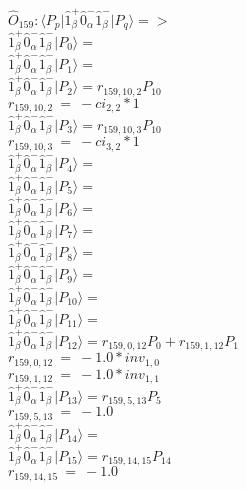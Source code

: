 \documentclass[14pt]{article}
\begin{document}
    $\hat{O}_{159}:  \langle{P_p}\vert \hat{1}_{\beta}^{+}\hat{0}_{\alpha}^{-}\hat{1}_{\beta}^{-} \vert{P_q}\rangle => $ \\ 
    $ \hat{1}_{\beta}^{+}\hat{0}_{\alpha}^{-}\hat{1}_{\beta}^{-} \vert{P_{0}}\rangle =  $ \\ 
    $ \hat{1}_{\beta}^{+}\hat{0}_{\alpha}^{-}\hat{1}_{\beta}^{-} \vert{P_{1}}\rangle =  $ \\ 
    $ \hat{1}_{\beta}^{+}\hat{0}_{\alpha}^{-}\hat{1}_{\beta}^{-} \vert{P_{2}}\rangle = {r}_{159,10,2}P_{10} $ \\ 
    ${r}_{159,10,2}\ =\ -{ci}_{2,2}*1 $ \\ 
    $ \hat{1}_{\beta}^{+}\hat{0}_{\alpha}^{-}\hat{1}_{\beta}^{-} \vert{P_{3}}\rangle = {r}_{159,10,3}P_{10} $ \\ 
    ${r}_{159,10,3}\ =\ -{ci}_{3,2}*1 $ \\ 
    $ \hat{1}_{\beta}^{+}\hat{0}_{\alpha}^{-}\hat{1}_{\beta}^{-} \vert{P_{4}}\rangle =  $ \\ 
    $ \hat{1}_{\beta}^{+}\hat{0}_{\alpha}^{-}\hat{1}_{\beta}^{-} \vert{P_{5}}\rangle =  $ \\ 
    $ \hat{1}_{\beta}^{+}\hat{0}_{\alpha}^{-}\hat{1}_{\beta}^{-} \vert{P_{6}}\rangle =  $ \\ 
    $ \hat{1}_{\beta}^{+}\hat{0}_{\alpha}^{-}\hat{1}_{\beta}^{-} \vert{P_{7}}\rangle =  $ \\ 
    $ \hat{1}_{\beta}^{+}\hat{0}_{\alpha}^{-}\hat{1}_{\beta}^{-} \vert{P_{8}}\rangle =  $ \\ 
    $ \hat{1}_{\beta}^{+}\hat{0}_{\alpha}^{-}\hat{1}_{\beta}^{-} \vert{P_{9}}\rangle =  $ \\ 
    $ \hat{1}_{\beta}^{+}\hat{0}_{\alpha}^{-}\hat{1}_{\beta}^{-} \vert{P_{10}}\rangle =  $ \\ 
    $ \hat{1}_{\beta}^{+}\hat{0}_{\alpha}^{-}\hat{1}_{\beta}^{-} \vert{P_{11}}\rangle =  $ \\ 
    $ \hat{1}_{\beta}^{+}\hat{0}_{\alpha}^{-}\hat{1}_{\beta}^{-} \vert{P_{12}}\rangle = {r}_{159,0,12}P_{0}+{r}_{159,1,12}P_{1} $ \\ 
    ${r}_{159,0,12}\ =\ -1.0*{inv}_{1,0} $ \\ 
    ${r}_{159,1,12}\ =\ -1.0*{inv}_{1,1} $ \\ 
    $ \hat{1}_{\beta}^{+}\hat{0}_{\alpha}^{-}\hat{1}_{\beta}^{-} \vert{P_{13}}\rangle = {r}_{159,5,13}P_{5} $ \\ 
    ${r}_{159,5,13}\ =\ -1.0 $ \\ 
    $ \hat{1}_{\beta}^{+}\hat{0}_{\alpha}^{-}\hat{1}_{\beta}^{-} \vert{P_{14}}\rangle =  $ \\ 
    $ \hat{1}_{\beta}^{+}\hat{0}_{\alpha}^{-}\hat{1}_{\beta}^{-} \vert{P_{15}}\rangle = {r}_{159,14,15}P_{14} $ \\ 
    ${r}_{159,14,15}\ =\ -1.0 $ \\ 
    
\end{document}
